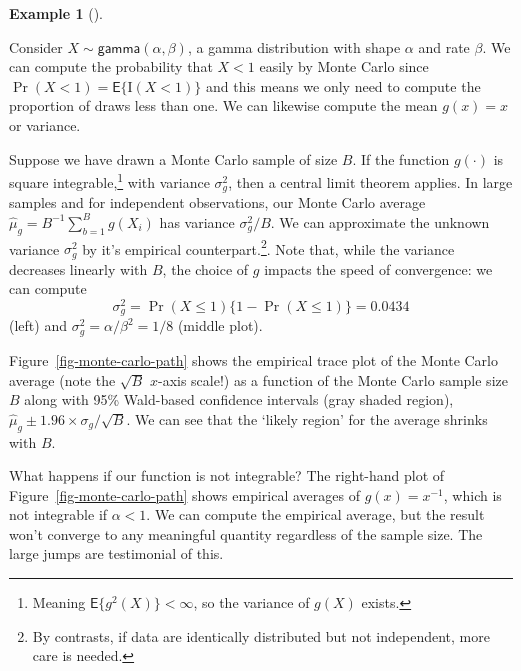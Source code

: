 \documentclass[
  11pt,
  letterpaper,
]{scrbook}
\theoremstyle{definition}
\theoremstyle{plain}
\theoremstyle{plain}
\theoremstyle{definition}
\newtheorem{example}{Example}[chapter]
\theoremstyle{definition}
\theoremstyle{remark}
\begin{document}
\begin{example}[]\protect\hypertarget{exm-expectation-demo}{}\label{exm-expectation-demo}

Consider \(X \sim \mathsf{gamma}(\alpha, \beta)\), a gamma distribution
with shape \(\alpha\) and rate \(\beta\). We can compute the probability
that \(X < 1\) easily by Monte Carlo since
\(\Pr(X <1) = \mathsf{E}\{\mathrm{I}(X<1)\}\) and this means we only
need to compute the proportion of draws less than one. We can likewise
compute the mean \(g(x) = x\) or variance.

Suppose we have drawn a Monte Carlo sample of size \(B\). If the
function \(g(\cdot)\) is square integrable,\footnote{Meaning
  \(\mathsf{E}\{g^2(X)\}<\infty\), so the variance of \(g(X)\) exists.}
with variance \(\sigma^2_g\), then a central limit theorem applies. In
large samples and for independent observations, our Monte Carlo average
\(\widehat{\mu}_g = B^{-1}\sum_{b=1}^B g(X_i)\) has variance
\(\sigma^2_g/B\). We can approximate the unknown variance \(\sigma^2_g\)
by it's empirical counterpart.\footnote{By contrasts, if data are
  identically distributed but not independent, more care is needed.}.
Note that, while the variance decreases linearly with \(B\), the choice
of \(g\) impacts the speed of convergence: we can compute
\[\sigma^2_g =\Pr(X \leq 1)\{1-\Pr(X \leq 1)\}=0.0434\] (left) and
\(\sigma^2_g=\alpha/\beta^2=1/8\) (middle plot).

Figure~\ref{fig-monte-carlo-path} shows the empirical trace plot of the
Monte Carlo average (note the \(\sqrt{B}\) \(x\)-axis scale!) as a
function of the Monte Carlo sample size \(B\) along with 95\% Wald-based
confidence intervals (gray shaded region),
\(\widehat{\mu}_g \pm 1.96 \times \sigma_g/\sqrt{B}\). We can see that
the `likely region' for the average shrinks with \(B\).

What happens if our function is not integrable? The right-hand plot of
Figure~\ref{fig-monte-carlo-path} shows empirical averages of
\(g(x) = x^{-1}\), which is not integrable if \(\alpha < 1\). We can
compute the empirical average, but the result won't converge to any
meaningful quantity regardless of the sample size. The large jumps are
testimonial of this.

\begin{figure}[ht!]

\centering{

}
\end{figure}
\end{example}
\end{document}
